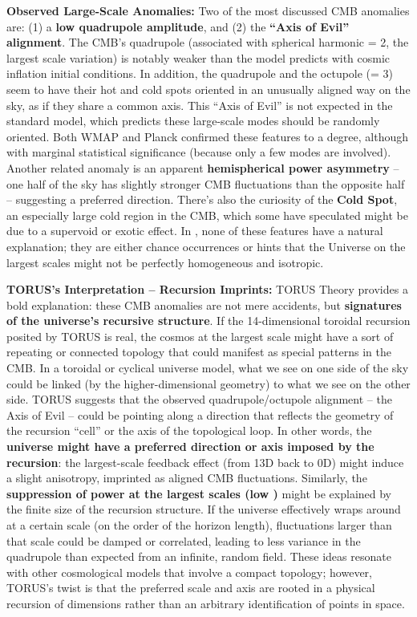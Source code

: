\documentclass[
]{article}
\begin{document}
{\textbf{Observed Large-Scale Anomalies:} Two of the most discussed CMB
anomalies are: (1) a \textbf{low quadrupole amplitude}, and (2) the
\textbf{``Axis of Evil'' alignment}. The CMB's quadrupole (associated
with spherical harmonic \ell = 2, the largest scale variation) is notably
weaker than the \LambdaCDM model predicts with cosmic inflation initial
conditions. In addition, the quadrupole and the octupole (\ell = 3) seem to
have their hot and cold spots oriented in an unusually aligned way on
the sky, as if they share a common axis. This ``Axis of Evil'' is not
expected in the standard model, which predicts these large-scale modes
should be randomly oriented. Both WMAP and Planck confirmed these
features to a degree, although with marginal statistical significance
(because only a few modes are involved). Another related anomaly is an
apparent \textbf{hemispherical power asymmetry} -- one half of the sky
has slightly stronger CMB fluctuations than the opposite half --
suggesting a preferred direction. There's also the curiosity of the
\textbf{Cold Spot}, an especially large cold region in the CMB, which
some have speculated might be due to a supervoid or exotic effect. In
\LambdaCDM, none of these features have a natural explanation; they are either
chance occurrences or hints that the Universe on the largest scales
might not be perfectly homogeneous and isotropic.

\textbf{TORUS's Interpretation -- Recursion Imprints:} TORUS Theory
provides a bold explanation: these CMB anomalies are not mere accidents,
but \textbf{signatures of the universe's recursive structure}. If the
14-dimensional toroidal recursion posited by TORUS is real, the cosmos
at the largest scale might have a sort of repeating or connected
topology that could manifest as special patterns in the CMB. In a
toroidal or cyclical universe model, what we see on one side of the sky
could be linked (by the higher-dimensional geometry) to what we see on
the other side. TORUS suggests that the observed quadrupole/octupole
alignment -- the Axis of Evil -- could be pointing along a direction
that reflects the geometry of the recursion ``cell'' or the axis of the
topological loop\hspace{0pt}. In other words, the \textbf{universe might
have a preferred direction or axis imposed by the recursion}: the
largest-scale feedback effect (from 13D back to 0D) might induce a
slight anisotropy, imprinted as aligned CMB fluctuations\hspace{0pt}.
Similarly, the \textbf{suppression of power at the largest scales (low
\ell)} might be explained by the finite size of the recursion structure. If
the universe effectively wraps around at a certain scale (on the order
of the horizon length), fluctuations larger than that scale could be
damped or correlated, leading to less variance in the quadrupole than
expected from an infinite, random field. These ideas resonate with other
cosmological models that involve a compact topology; however, TORUS's
twist is that the preferred scale and axis are rooted in a physical
recursion of dimensions rather than an arbitrary identification of
points in space.

}
\end{document}
